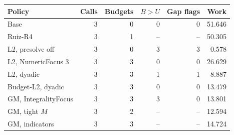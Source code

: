 \begin{tabular}{lrrrrr}
\toprule
Policy & Calls & Budgets & $B>U$ & Gap flags & Work\\
\midrule
Base & 3 & 0 & 0 & 0 & 51.646\\
Ruiz-R4 & 3 & 1 & -- & -- & 50.305\\
L2, presolve off & 3 & 0 & 3 & 3 & 0.578\\
L2, NumericFocus 3 & 3 & 3 & 0 & 0 & 26.629\\
L2, dyadic & 3 & 3 & 1 & 1 & 8.887\\
Budget-L2, dyadic & 3 & 3 & 0 & 0 & 13.479\\
GM, IntegralityFocus & 3 & 3 & 3 & 0 & 13.801\\
GM, tight $M$ & 3 & 2 & -- & -- & 12.594\\
GM, indicators & 3 & 3 & -- & -- & 14.724\\
\bottomrule
\end{tabular}
